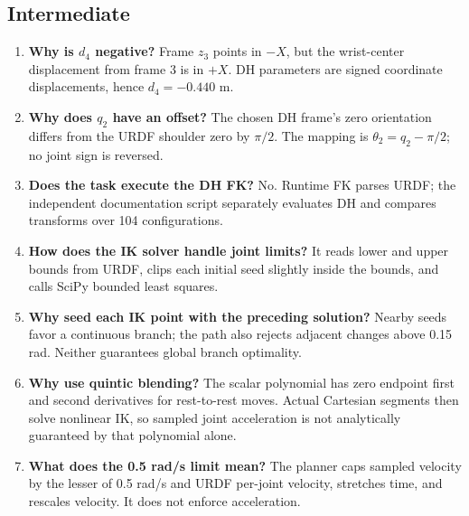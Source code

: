 \subsection{Intermediate}
\begin{enumerate}
 \item \textbf{Why is $d_4$ negative?} Frame $z_3$ points in $-X$, but the
 wrist-center displacement from frame 3 is in $+X$. DH parameters are signed
 coordinate displacements, hence $d_4=-0.440$ m.
 \item \textbf{Why does $q_2$ have an offset?} The chosen DH frame's zero
 orientation differs from the URDF shoulder zero by $\pi/2$. The mapping is
 $\theta_2=q_2-\pi/2$; no joint sign is reversed.
 \item \textbf{Does the task execute the DH FK?} No. Runtime FK parses URDF;
 the independent documentation script separately evaluates DH and compares
 transforms over 104 configurations.
 \item \textbf{How does the IK solver handle joint limits?} It reads lower
 and upper bounds from URDF, clips each initial seed slightly inside the
 bounds, and calls SciPy bounded least squares.
 \item \textbf{Why seed each IK point with the preceding solution?} Nearby
 seeds favor a continuous branch; the path also rejects adjacent changes
 above 0.15 rad. Neither guarantees global branch optimality.
 \item \textbf{Why use quintic blending?} The scalar polynomial has zero
 endpoint first and second derivatives for rest-to-rest moves. Actual
 Cartesian segments then solve nonlinear IK, so sampled joint acceleration
 is not analytically guaranteed by that polynomial alone.
 \item \textbf{What does the 0.5 rad/s limit mean?} The planner caps
 sampled velocity by the lesser of 0.5 rad/s and URDF per-joint velocity,
 stretches time, and rescales velocity. It does not enforce acceleration.
\end{enumerate}

